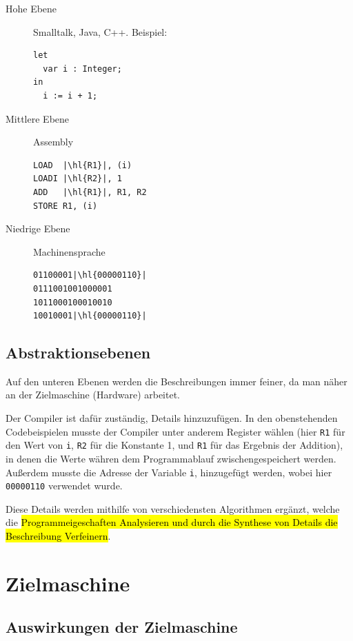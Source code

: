 \documentclass[
  ngerman,
  DIV=12
]{scrartcl}
\begin{document}
\begin{description}
\item[Hohe Ebene] Smalltalk, Java, C++. Beispiel:
\begin{lstlisting}
let
  var i : Integer;
in
  i := i + 1;
\end{lstlisting}
\item[Mittlere Ebene] Assembly
\begin{lstlisting}
LOAD  |\hl{R1}|, (i)
LOADI |\hl{R2}|, 1
ADD   |\hl{R1}|, R1, R2
STORE R1, (i)
\end{lstlisting}
\item[Niedrige Ebene] Machinensprache
\begin{lstlisting}
01100001|\hl{00000110}|
0111001001000001
1011000100010010
10010001|\hl{00000110}|
\end{lstlisting}
\end{description}

\subsection{Abstraktionsebenen}

Auf den unteren Ebenen werden die Beschreibungen immer feiner, da man näher an der Zielmaschine (Hardware) arbeitet.

Der Compiler ist dafür zuständig, Details hinzuzufügen. In den obenstehenden Codebeispielen musste der Compiler unter anderem Register wählen (hier \verb|R1| für den Wert von \verb|i|, \verb|R2| für die Konstante 1, und \verb|R1| für das Ergebnis der Addition), in denen die Werte währen dem Programmablauf zwischengespeichert werden. Außerdem musste die Adresse der Variable \verb|i|, hinzugefügt werden, wobei hier \verb|00000110| verwendet wurde.

Diese Details werden mithilfe von verschiedensten Algorithmen ergänzt, welche die \hl{Programmeigeschaften Analysieren und durch die Synthese von Details die Beschreibung Verfeinern}.

\section{Zielmaschine}

\subsection{Auswirkungen der Zielmaschine}
\end{document}
